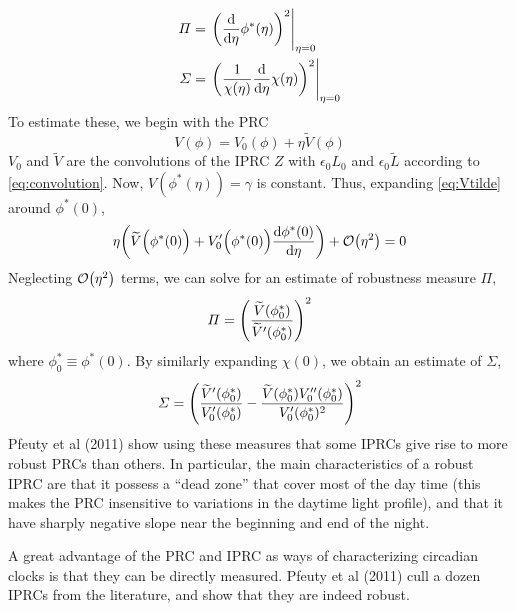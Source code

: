 \documentclass[10pt,letter, swedish, english,%
]{article}
\begin{document}
\begin{equation}
\begin{aligned}
\varPi &=\eval{\qty(\dv{\eta} \phi^{*}(\eta) )^{2}}_{\eta=0}
\\
\varSigma &=\eval{\qty(\frac{1}{\chi(\eta)}
\dv{\eta} \chi(\eta) )^{2}}_{\eta=0}
\end{aligned}
\end{equation}
To estimate these, we begin with the PRC
\begin{equation}\label{eq:Vtilde}
V(\phi)=V_{0}(\phi)
+\eta\widetilde{V}(\phi)
\end{equation}
$V_{0}$ and $\widetilde{V}$ are the convolutions of the IPRC 
$Z$ with $\epsilon_{0}L_{0}$ and 
$\epsilon_{0}\widetilde{L}$ according to \eqref{eq:convolution}. Now, 
$V({\phi}^{*}(\eta))=\gamma$ is constant. Thus, expanding
\eqref{eq:Vtilde} around $\phi^{*}(0)$, 
\begin{equation}
\eta \qty(\widetilde{V}\Big(\phi^{*}(0)\Big)
+{V}_{0}'\Big(\phi^*(0)\Big)\dv{\phi^{*}(0)}{\eta})
+\order{\eta^2} = 0
\end{equation}
Neglecting $\order{\eta^2}$ terms, we can solve for an estimate of
robustness measure $\varPi$,
\begin{equation}
\varPi=\qty(
\frac{\widetilde{V}(\phi_{0}^{*})}
{\widetilde{V}'(\phi_{0}^{*})}
)^{2}
\end{equation}
where $\phi_{0}^{*}\equiv\phi^{*}(0)$. By similarly
expanding $\chi(0)$, we obtain an estimate of $\varSigma$,
\begin{equation}
\varSigma =\qty(
\frac{\widetilde{V}'(\phi_0^{*})}
{V_0'(\phi_0^{*})}
-\frac{\widetilde{V}(\phi_0^{*}){V}_0''(\phi_0^{*})}
{V_0'(\phi_0^{*})^{2}}
)^{2}
\end{equation}
Pfeuty et al (2011) show using these measures that some IPRCs give
rise to more robust PRCs than others. In particular, the main
characteristics of a robust IPRC are that it possess a “dead zone”
that cover most of the day time (this makes the PRC insensitive to
variations in the daytime light profile), and that it have sharply
negative slope near the beginning and end of the night. 

A great advantage of the PRC and IPRC as ways of characterizing
circadian clocks is that they can be directly measured. Pfeuty et al
(2011) cull a dozen IPRCs from the literature, and show that they are
indeed robust. 
\end{document}

